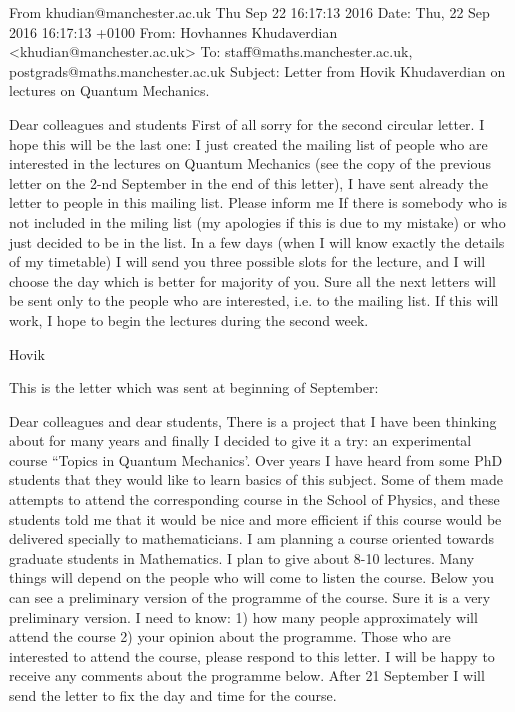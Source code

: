 From khudian@manchester.ac.uk Thu Sep 22 16:17:13 2016
Date: Thu, 22 Sep 2016 16:17:13 +0100
From: Hovhannes Khudaverdian <khudian@manchester.ac.uk>
To: staff@maths.manchester.ac.uk, postgrads@maths.manchester.ac.uk
Subject: Letter from Hovik Khudaverdian on lectures on Quantum Mechanics.


               Dear colleagues and students
   First of all sorry for the second circular letter.
  I hope this will be the last one:
    I just created the mailing list of people who are interested in the
lectures on Quantum Mechanics (see the copy of the previous letter on 
the 2-nd  September in the end of this letter),
    I have sent already the letter to people in this mailing list.
    Please inform me If there is somebody who is not included in the miling
list (my apologies if this is due to my mistake)  or who 
just decided to be in the list.
   In a few days (when I will know exactly the details of my timetable)
   I will send you three possible slots for the lecture, 
and I will choose the day which is better for majority of you.
   Sure all the next letters will be sent only to the people who are 
interested, i.e. to the mailing list.
   If this will work,
   I hope to begin the lectures during the second week.

                  Hovik





    This is the letter which was sent at beginning of September:


              Dear colleagues and dear students,
     There is a project that I have been thinking about for many years and
finally I decided to give it a try:
an experimental course ``Topics in Quantum Mechanics'.
     Over years I have heard from some PhD students that they would like to
learn basics of this subject. Some of them made attempts to attend the
corresponding course in the School of Physics, and these students told
me that it would be nice and more efficient if this course would be
delivered specially to mathematicians.
     I am planning a course oriented towards graduate students in
Mathematics. I plan to give about 8-10 lectures. Many things will depend
on the people who will come to listen the course.
     Below you can see a preliminary version of the programme of the course.
Sure it is a very preliminary version.
         I need to know:
1) how many people approximately  will attend the course
2) your opinion about the programme.
     Those who are interested to attend the course, please respond to this
letter. I will be happy to receive any comments about the programme below.
         After 21 September I will send the letter to fix the day
and time for the course.

